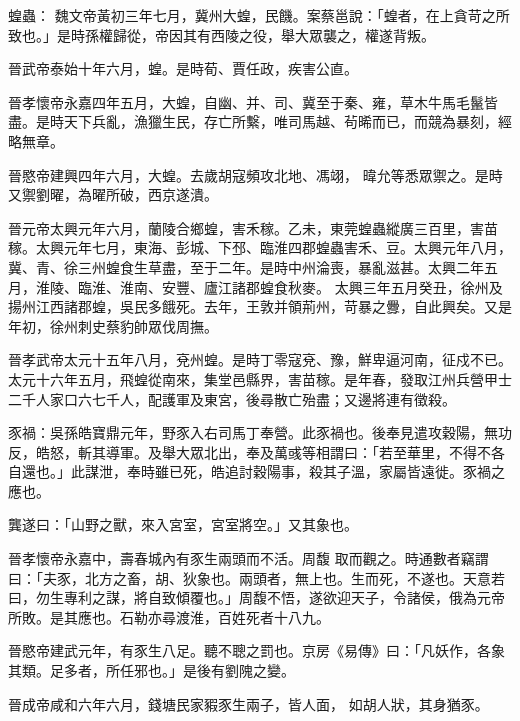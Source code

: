 \begin{pinyinscope}
 蝗蟲：
 魏文帝黃初三年七月，冀州大蝗，民饑。案蔡邕說：「蝗者，在上貪苛之所致也。」是時孫權歸從，帝因其有西陵之役，舉大眾襲之，權遂背叛。



 晉武帝泰始十年六月，蝗。是時荀、賈任政，疾害公直。



 晉孝懷帝永嘉四年五月，大蝗，自幽、并、司、冀至于秦、雍，草木牛馬毛鬣皆盡。是時天下兵亂，漁獵生民，存亡所繫，唯司馬越、茍晞而已，而競為暴刻，經略無章。



 晉愍帝建興四年六月，大蝗。去歲胡寇頻攻北地、馮翊，
 暐允等悉眾禦之。是時又禦劉曜，為曜所破，西京遂潰。



 晉元帝太興元年六月，蘭陵合鄉蝗，害禾稼。乙未，東莞蝗蟲縱廣三百里，害苗稼。太興元年七月，東海、彭城、下邳、臨淮四郡蝗蟲害禾、豆。太興元年八月，冀、青、徐三州蝗食生草盡，至于二年。是時中州淪喪，暴亂滋甚。太興二年五月，淮陵、臨淮、淮南、安豐、廬江諸郡蝗食秋麥。
 太興三年五月癸丑，徐州及揚州江西諸郡蝗，吳民多餓死。去年，王敦并領荊州，苛暴之釁，自此興矣。又是年初，徐州刺史蔡豹帥眾伐周撫。



 晉孝武帝太元十五年八月，兗州蝗。是時丁零寇兗、豫，鮮卑逼河南，征戍不已。太元十六年五月，飛蝗從南來，集堂邑縣界，害苗稼。是年春，發取江州兵營甲士二千人家口六七千人，配護軍及東宮，後尋散亡殆盡；又邊將連有徵殺。



 豕禍：吳孫皓寶鼎元年，野豕入右司馬丁奉營。此豕禍也。後奉見遣攻穀陽，無功反，皓怒，斬其導軍。及舉大眾北出，奉及萬彧等相謂曰：「若至華里，不得不各自還也。」此謀泄，奉時雖已死，皓追討穀陽事，殺其子溫，家屬皆遠徙。豕禍之應也。



 龔遂曰：「山野之獸，來入宮室，宮室將空。」又其象也。



 晉孝懷帝永嘉中，壽春城內有豕生兩頭而不活。周馥
 取而觀之。時通數者竊謂曰：「夫豕，北方之畜，胡、狄象也。兩頭者，無上也。生而死，不遂也。天意若曰，勿生專利之謀，將自致傾覆也。」周馥不悟，遂欲迎天子，令諸侯，俄為元帝所敗。是其應也。石勒亦尋渡淮，百姓死者十八九。



 晉愍帝建武元年，有豕生八足。聽不聰之罰也。京房《易傳》曰：「凡妖作，各象其類。足多者，所任邪也。」是後有劉隗之變。



 晉成帝咸和六年六月，錢塘民家豭豕生兩子，皆人面，
 如胡人狀，其身猶豕。




\end{pinyinscope}
